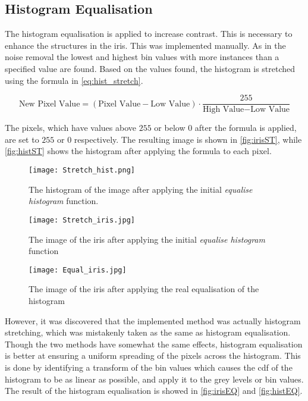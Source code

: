 \subsection{Histogram Equalisation}
\label{sec:HistEq}
The histogram equalisation is applied to increase contrast. This is necessary to enhance the structures in the iris. This was implemented manually. As in the noise removal the lowest and highest bin values with more instances than a specified value are found. Based on the values found, the histogram is stretched using the formula in \autoref{eq:hist_stretch}.

\begin{equation}\label{eq:hist_stretch}
	\text{New~Pixel~Value}=(\text{Pixel~Value}-\text{Low~Value})\cdot\frac{255}{\text{High~Value}-\text{Low~Value}}
\end{equation}

The pixels, which have values above $ 255 $ or below $ 0 $ after the formula is applied, are set to $ 255 $ or $ 0 $ respectively. The resulting image is shown in \autoref{fig:irisST}, while \autoref{fig:histST} shows the histogram after applying the formula to each pixel.

\begin{figure}[H]
\centering
\texttt{[image: Stretch\_hist.png]}
\caption{The histogram of the image after applying the initial \textit{equalise histogram} function.}
\label{fig:histST}
\end{figure}



\begin{figure}[H]
\centering
\texttt{[image: Stretch\_iris.jpg]}
\caption{The image of the iris after applying the initial \textit{equalise histogram} function}
\label{fig:irisST}
\end{figure}
\begin{figure}[H]
\centering
\texttt{[image: Equal\_iris.jpg]}
\caption{The image of the iris after applying the real equalisation of the histogram}
\label{fig:irisEQ}
\end{figure}

However, it was discovered that the implemented method was actually histogram stretching, which was mistakenly taken as the same as histogram equalisation. Though the two methods have somewhat the same effects, histogram equalisation is better at ensuring a uniform spreading of the pixels across the histogram. 
This is done by identifying a transform of the bin values which causes the \gls{cdf} of the histogram to be as linear as possible, and apply it to the grey levels or bin values. The result of the histogram equalisation is showed in \autoref{fig:irisEQ} and \autoref{fig:histEQ}.

